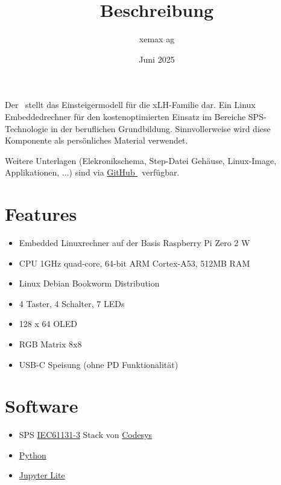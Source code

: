 \documentclass[10pt]{datasheet}
\title{Beschreibung \xlhPlattformID}
\author{xemax ag}
\date{Juni 2025}
\begin{document}
\maketitle



Der \textbf{\xlhPlattformID}\ stellt das Einsteigermodell für die xLH-Familie dar.
Ein Linux Embeddedrechner für den kostenoptimierten Einsatz im Bereiche SPS-Technologie in der beruflichen Grundbildung.
Sinnvollerweise wird diese Komponente als persönliches Material verwendet.

Weitere Unterlagen (Elekronikschema, Step-Datei Gehäuse, Linux-Image, Applikationen, ...) sind via
\href{https://github.com/xemax-ag/xLH/}{GitHub \xlhPlattformID}\ verfügbar.

\section{Features}

\begin{itemize}
    \item Embedded Linuxrechner auf der Basis Raspberry Pi Zero 2 W
    \item CPU 1GHz quad-core, 64-bit ARM Cortex-A53, 512MB RAM
    \item Linux Debian Bookworm Distribution
    \item 4 Taster, 4 Schalter, 7 LEDs
    \item 128 x 64 OLED
    \item RGB Matrix 8x8
    \item USB-C Speisung (ohne PD Funktionalität)
\end{itemize}

\section{Software}

\begin{itemize}
    \item SPS \href{https://de.wikipedia.org/wiki/EN_61131}{IEC61131-3} Stack von \href{https://www.codesys.com/}{Codesys}
    \item \href{https://www.python.org/}{Python}
    \item \href{https://jupyter.org/try-jupyter/lab/}{Jupyter Lite}
\end{itemize}
\end{document}
